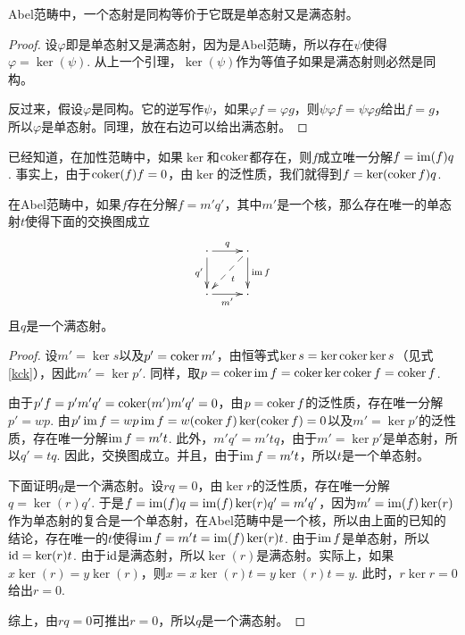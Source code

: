 \begin{pro}
Abel范畴中，一个态射是同构等价于它既是单态射又是满态射。
\end{pro}

\begin{proof}
设$\varphi$即是单态射又是满态射，因为是Abel范畴，所以存在$\psi$使得$\varphi=\ker(\psi)$. 从上一个引理，$\ker(\psi)$作为等值子如果是满态射则必然是同构。

反过来，假设$\varphi$是同构。它的逆写作$\psi$，如果$\varphi f=\varphi g$，则$\psi\varphi f =\psi\varphi g$给出$f=g$，所以$\varphi$是单态射。同理，放在右边可以给出满态射。
\end{proof}

已经知道，在加性范畴中，如果$\ker$和$\operatorname{coker}$都存在，则$f$成立唯一分解$f=\operatorname{im}(f)q$. 事实上，由于$\operatorname{coker}(f)f=0$，由$\ker$的泛性质，我们就得到$f=\ker(\operatorname{coker} f)q$.

\begin{lem}\label{lem1}
在Abel范畴中，如果$f$存在分解$f=m'q'$，其中$m'$是一个核，那么存在唯一的单态射$t$使得下面的交换图成立
\[
\begin{xy}
	\xymatrix{
	\cdot \ar[r]^q\ar[d]_{q'}& \cdot \ar[d]^{\im f}\ar@{-->}[dl]^t\\
	\cdot \ar[r]_{m'}& \cdot 
	}
\end{xy}
\]
且$q$是一个满态射。
\end{lem}

\begin{proof}
设$m'=\ker s$以及$p'=\operatorname{coker} m'$，由恒等式$\ker s=\ker \operatorname{coker} \ker s$（见式\eqref{kck}），因此$m'=\ker p'$. 同样，取$p=\operatorname{coker} \operatorname{im} f=\operatorname{coker} \ker \operatorname{coker} f=\operatorname{coker} f$. 

由于$p'f=p'm'q'=\operatorname{coker}(m')m'q'=0$，由$p=\operatorname{coker} f$的泛性质，存在唯一分解$p'=wp$. 由$p'\operatorname{im} f=wp\operatorname{im} f=w (\operatorname{coker} f) \ker(\operatorname{coker} f)=0$以及$m'=\ker p'$的泛性质，存在唯一分解$\operatorname{im} f=m' t$. 此外，$m' q'=m'tq$，由于$m'=\ker p'$是单态射，所以$q'=tq$. 因此，交换图成立。并且，由于$\operatorname{im} f=m't$，所以$t$是一个单态射。

下面证明$q$是一个满态射。设$rq=0$，由$\ker r$的泛性质，存在唯一分解$q=\ker (r) q'$. 于是$f=\operatorname{im}(f)q=\operatorname{im}(f)\ker (r) q'=m'q'$，因为$m'=\operatorname{im}(f)\ker (r)$作为单态射的复合是一个单态射，在Abel范畴中是一个核，所以由上面的已知的结论，存在唯一的$t$使得$\operatorname{im} f=m't=\operatorname{im}(f)\ker (r) t$. 由于$\operatorname{im} f$是单态射，所以$\operatorname{id} =\ker (r) t$. 由于$\operatorname{id}$是满态射，所以$\ker (r)$是满态射。实际上，如果$x\ker(r)=y\ker(r)$，则$x=x\ker (r) t=y\ker (r) t=y$. 此时，$r\ker r=0$给出$r=0$. 

综上，由$rq=0$可推出$r=0$，所以$q$是一个满态射。
\end{proof}

